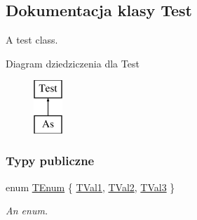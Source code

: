 \hypertarget{classTest}{\subsection{Dokumentacja klasy Test}
\label{classTest}
}


A test class.  


Diagram dziedziczenia dla Test\begin{figure}[H]
\begin{center}
\leavevmode
\includegraphics[height=2.000000cm]{classTest}
\end{center}
\end{figure}
\subsubsection*{Typy publiczne}
\begin{DoxyCompactItemize}
\item 
enum \hyperlink{classTest_ad8d13fe56b896633273087859b89a1a3}{T\-Enum} \{ \hyperlink{classTest_ad8d13fe56b896633273087859b89a1a3abf8059769020a35c76df3d8b02521273}{T\-Val1}, 
\hyperlink{classTest_ad8d13fe56b896633273087859b89a1a3a38ab2f54365cee5e5561b04f32f053e3}{T\-Val2}, 
\hyperlink{classTest_ad8d13fe56b896633273087859b89a1a3ad63507e26f2168659722f1ef575b50b2}{T\-Val3}
 \}
\begin{DoxyCompactList}\small\item\em An enum. \end{DoxyCompactList}\end{DoxyCompactItemize}
